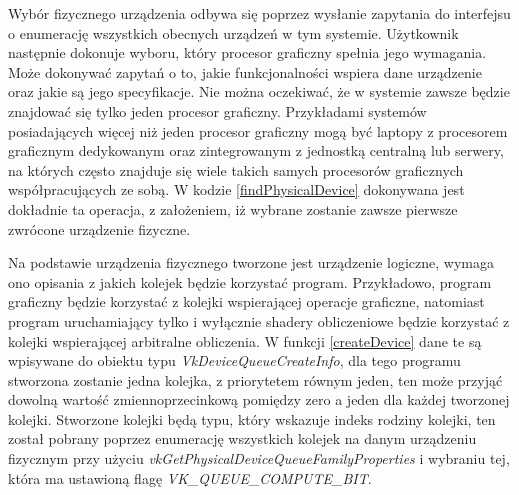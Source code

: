 Wybór fizycznego urządzenia odbywa się poprzez wysłanie zapytania do interfejsu o enumerację wszystkich obecnych urządzeń w tym systemie.
Użytkownik następnie dokonuje wyboru, który procesor graficzny spełnia jego wymagania. 
Może dokonywać zapytań o to, jakie funkcjonalności wspiera dane urządzenie oraz jakie są jego specyfikacje.
Nie można oczekiwać, że w systemie zawsze będzie znajdować się tylko jeden procesor graficzny.
Przykładami systemów posiadających więcej niż jeden procesor graficzny mogą być laptopy z procesorem graficznym dedykowanym oraz zintegrowanym z jednostką centralną lub serwery, na których często znajduje się wiele takich samych procesorów graficznych współpracujących ze sobą.
W kodzie \ref{findPhysicalDevice} dokonywana jest dokładnie ta operacja, z założeniem, iż wybrane zostanie zawsze pierwsze zwrócone urządzenie fizyczne.

Na podstawie urządzenia fizycznego tworzone jest urządzenie logiczne, wymaga ono opisania z jakich kolejek będzie korzystać program.
Przykładowo, program graficzny będzie korzystać z kolejki wspierającej operacje graficzne, natomiast program uruchamiający tylko i wyłącznie shadery obliczeniowe będzie korzystać z kolejki wspierającej arbitralne obliczenia.
W funkcji \ref{createDevice} dane te są wpisywane do obiektu typu \textit{VkDeviceQueueCreateInfo}, dla tego programu stworzona zostanie jedna kolejka, z priorytetem równym jeden, ten może przyjąć dowolną wartość zmiennoprzecinkową pomiędzy zero a jeden dla każdej tworzonej kolejki.
Stworzone kolejki będą typu, który wskazuje indeks rodziny kolejki, ten został pobrany poprzez enumerację wszystkich kolejek na danym urządzeniu fizycznym przy użyciu \textit{vkGetPhysicalDeviceQueueFamilyProperties} i wybraniu tej, która ma ustawioną flagę \textit{VK\_QUEUE\_COMPUTE\_BIT}.

